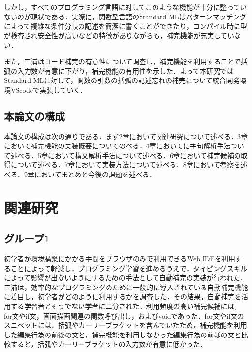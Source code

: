 \documentclass[12pt,a4j]{jreport}
\begin{document}
しかし，すべてのプログラミング言語に対してこのような機能が十分に整っていないのが現状である．実際に，関数型言語のStandard ML\cite{StandardML}はパターンマッチングによって複雑な条件分岐の記述を簡潔に書くことができたり，コンパイル時に型が検査され安全性が高いなどの特徴がありながらも，補完機能が充実していない．

また，三浦\cite{eff}はコード補完の有意性について調査し，補完機能を利用することで括弧の入力数が有意に下がり，補完機能の有用性を示した．よって本研究ではStandard MLに対して，関数の引数の括弧の記述忘れの補完について統合開発環境VScode\cite{vscode}で実装していく．









\section{本論文の構成}
本論文の構成は次の通りである．まず2章において関連研究について述べる．3章において補完機能の実装概要についてのべる．4章においてに字句解析手法ついて述べる．5章において構文解析手法について述べる．6章において補完候補の取得について述べる．7章において実装方法について述べる．8章において考察を述べる．9章においてまとめと今後の課題を述べる．

\chapter{関連研究}

\section{グループ1}
初学者が環境構築にかかる手間をブラウザのみで利用できるWeb IDEを利用することによって軽減し，プログラミング学習を進めるうえで，タイピングスキルによって影響が出ないようにするための手法として自動補完の実装が行われた\cite{eff}．三浦は，効率的なプログラミングのために一般的に導入されている自動補完機能に着目し，初学者がどのように利用するかを調査した．その結果，自動補完を活用する学習者とそうでない学者に二分された．利用頻度の高い補完候補には，for文やif文，画面描画関連の関数呼び出し，およびvoidであった．for文やif文のスニペットには、括弧やカーリーブラケットを含んでいたため，補完機能を利用した編集行為の前後の文と，補完機能を利用しなかった編集行為の前ぼの文と比較すると，括弧やカーリーブラケットの入力数が有意に低かった．
\end{document}

